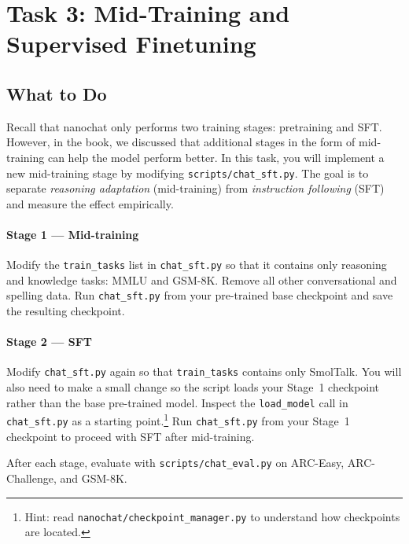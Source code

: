 

\section{Task 3: Mid-Training and Supervised Finetuning}
\label{sec:task3}

\subsection{What to Do}

Recall that nanochat only performs two training stages: pretraining and SFT. However, in the book, we discussed that additional stages in the form of mid-training can help the model perform better. In this task, you will implement a new mid-training stage by modifying \texttt{scripts/chat\_sft.py}. The goal is to separate \emph{reasoning adaptation} (mid-training) from \emph{instruction following} (SFT) and measure the effect empirically.

\paragraph{Stage 1 --- Mid-training}
Modify the \texttt{train\_tasks} list in \texttt{chat\_sft.py} so that it contains only reasoning and knowledge tasks: MMLU and GSM-8K. Remove all other conversational and spelling data. Run \texttt{chat\_sft.py} from your pre-trained base checkpoint and save the resulting checkpoint.

\paragraph{Stage 2 --- SFT}
Modify \texttt{chat\_sft.py} again so that \texttt{train\_tasks} contains only SmolTalk. You will also need to make a small change so the script loads your Stage~1 checkpoint rather than the base pre-trained model. Inspect the \texttt{load\_model} call in \texttt{chat\_sft.py} as a starting point.\footnote{Hint: read \texttt{nanochat/checkpoint\_manager.py} to understand how checkpoints are located.} Run \texttt{chat\_sft.py} from your Stage~1 checkpoint to proceed with SFT after mid-training.

After each stage, evaluate with \texttt{scripts/chat\_eval.py} on ARC-Easy, ARC-Challenge, and GSM-8K.

